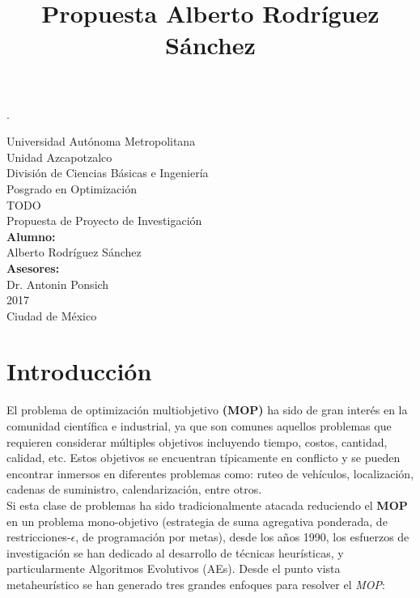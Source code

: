 \documentclass[letterpaper,10pt]{article}
\title{Propuesta Alberto Rodríguez Sánchez}
\begin{document}
\renewcommand{\refname}{Bibliografía}.
\thispagestyle{empty}

\begin{center}
    {\Huge Universidad Autónoma Metropolitana }\\
    {\huge Unidad Azcapotzalco}\\
    \vspace{0.5cm}
    {\Large División de Ciencias Básicas e Ingeniería}\\
    \vspace{1.0cm}
    {\large Posgrado en Optimización}\\
    \vspace{2.0cm}    
    {\Large TODO}\\
    \vspace{1.0cm}
    {\large Propuesta de Proyecto de Investigación}\\
    \vspace{2.0cm}
    {\large\textbf{Alumno:}}\\
    Alberto Rodríguez Sánchez\\
    \vspace{1.5cm}
    \bigskip
    {\large\textbf{Asesores:}}\\
    Dr. Antonin Ponsich\\
    
    \vspace{1.5cm}
     2017\\
    \vspace{1.0cm}
    Ciudad de México\\
\end{center}
\newpage
\tableofcontents
\newpage
\section{Introducción}

El problema de optimización multiobjetivo \textbf{(MOP)} ha sido de gran interés en la comunidad científica e industrial, ya que son comunes aquellos problemas que requieren
considerar múltiples objetivos incluyendo tiempo, costos, cantidad, calidad, etc. Estos objetivos se encuentran típicamente en conflicto y se pueden encontrar inmersos en
diferentes problemas como: ruteo de vehículos, localización, cadenas de suministro, calendarización, entre otros.\\

Si esta clase de problemas ha sido tradicionalmente atacada reduciendo el \textbf{MOP} en un problema mono-objetivo (estrategia de suma agregativa ponderada, de restricciones-$\epsilon$,
de programación por metas), desde los años 1990, los esfuerzos de investigación se han dedicado al desarrollo de técnicas heurísticas, y particularmente Algoritmos Evolutivos (AEs).
Desde el punto vista metaheurístico se han generado tres grandes enfoques para resolver el \emph{MOP}:
\end{document}
